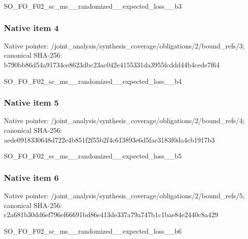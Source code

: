 \documentclass[10pt,a4paper]{article}
\begin{document}
\begingroup\raggedright\sloppy SO\_\allowbreak{}FO\_\allowbreak{}F02\_\allowbreak{}sc\_\allowbreak{}ms\_\allowbreak{}\_\allowbreak{}randomized\_\allowbreak{}\_\allowbreak{}expected\_\allowbreak{}loss\_\allowbreak{}\_\allowbreak{}b3\par\endgroup

\subsubsection{Native item 4}
Native pointer: /joint\_\allowbreak{}analysis/synthesis\_\allowbreak{}coverage/obligations/2/bound\_\allowbreak{}refs/3; canonical SHA-256: b790bb86d54a91734ce8623dbc23ac042e4155331da3955fcddd44b4cede7f64

\begingroup\raggedright\sloppy SO\_\allowbreak{}FO\_\allowbreak{}F02\_\allowbreak{}sc\_\allowbreak{}ms\_\allowbreak{}\_\allowbreak{}randomized\_\allowbreak{}\_\allowbreak{}expected\_\allowbreak{}loss\_\allowbreak{}\_\allowbreak{}b4\par\endgroup

\subsubsection{Native item 5}
Native pointer: /joint\_\allowbreak{}analysis/synthesis\_\allowbreak{}coverage/obligations/2/bound\_\allowbreak{}refs/4; canonical SHA-256: aede0918330648d722e4b851f2f55b2f4c613893e6d5fac3183f0da4cb1917b3

\begingroup\raggedright\sloppy SO\_\allowbreak{}FO\_\allowbreak{}F02\_\allowbreak{}sc\_\allowbreak{}ms\_\allowbreak{}\_\allowbreak{}randomized\_\allowbreak{}\_\allowbreak{}expected\_\allowbreak{}loss\_\allowbreak{}\_\allowbreak{}b5\par\endgroup

\subsubsection{Native item 6}
Native pointer: /joint\_\allowbreak{}analysis/synthesis\_\allowbreak{}coverage/obligations/2/bound\_\allowbreak{}refs/5; canonical SHA-256: c2a681b30dd6ef796ef66691bd86e413de337a79a747b1c1bae84e2440c8a429

\begingroup\raggedright\sloppy SO\_\allowbreak{}FO\_\allowbreak{}F02\_\allowbreak{}sc\_\allowbreak{}ms\_\allowbreak{}\_\allowbreak{}randomized\_\allowbreak{}\_\allowbreak{}expected\_\allowbreak{}loss\_\allowbreak{}\_\allowbreak{}b6\par\endgroup
\end{document}
